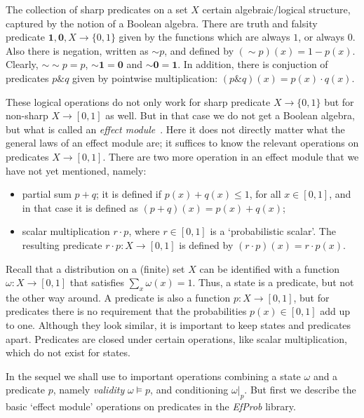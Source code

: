 \documentclass[leqno]{tufte-book} %
\newcommand{\EfProb}{\textit{EfProb}\xspace}
\newcommand{\andthen}{\mathrel{\&}}
\newcommand{\one}{\ensuremath{\mathbf{1}}}
\newcommand{\zero}{\ensuremath{\mathbf{0}}}
\newcommand{\ortho}{\mathop{\sim}}
\begin{document}
The collection of sharp predicates on a set $X$ certain
algebraic/logical structure, captured by the notion of a Boolean
algebra. There are truth and falsity predicate $\one, \zero, X
\rightarrow \{0,1\}$ given by the functions which are always $1$, or
always $0$. Also there is negation, written as $\ortho p$, and defined
by $(\ortho p)(x) = 1 - p(x)$. Clearly, $\ortho\ortho p = p$,
$\ortho\one = \zero$ and $\ortho\zero = \one$. In addition, there is
conjuction of predicates $p\andthen q$ given by pointwise
multiplication: $(p \andthen q)(x) = p(x) \cdot q(x)$.

These logical operations do not only work for sharp predicate $X
\rightarrow \{0,1\}$ but for non-sharp $X \rightarrow [0,1]$ as well.
But in that case we do not get a Boolean algebra, but what is called
an \emph{effect module}~\cite{Jacobs15}. Here it
does not directly matter what the general laws of an effect module
are; it suffices to know the relevant operations on predicates $X
\rightarrow [0,1]$.  There are two more operation in an effect module
that we have not yet mentioned, namely:
\begin{itemize}
\item partial sum $p+q$; it is defined if $p(x) + q(x) \leq 1$, for
  all $x\in [0,1]$, and in that case it is defined as $(p+q)(x) = p(x)
  + q(x)$;

\item scalar multiplication $r\cdot p$, where $r\in [0,1]$ is a
`probabilistic scalar'. The resulting predicate $r\cdot p \colon
X \rightarrow [0,1]$ is defined by $(r\cdot p)(x) = r\cdot p(x)$.
\end{itemize}

Recall that a distribution on a (finite) set $X$ can be identified
with a function $\omega \colon X \rightarrow [0,1]$ that satisfies
$\sum_{x}\omega(x) = 1$. Thus, a state is a predicate, but not the
other way around. A predicate is also a function $p\colon X
\rightarrow [0,1]$, but for predicates there is no requirement that
the probabilities $p(x) \in [0,1]$ add up to one. Although they look
similar, it is important to keep states and predicates apart.
Predicates are closed under certain operations, like scalar
multiplication, which do not exist for states.

In the sequel we shall use to important operations combining a state
$\omega$ and a predicate $p$, namely \emph{validity} $\omega\models
p$, and conditioning $\omega|_{p}$. But first we describe the basic
`effect module' operations on predicates in the \EfProb library.
\end{document}
